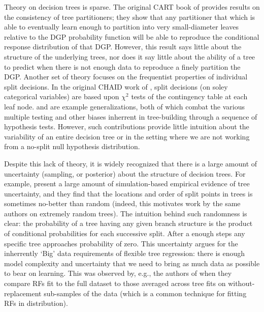 \documentclass{article}
\begin{document}
Theory on decision trees is sparse. The original CART book of
\cite{breiman_classification_1984} provides results on the consistency
of tree partitioners; they show that any partitioner that which is able
to eventually learn enough to partition into very small-diameter leaves
relative to the DGP probability function will be able to reproduce the
conditional response distribution of that DGP. However, this result says
little about the structure of the underlying trees, nor does it say
little about the ability of a tree to predict when there is not enough
data to reproduce a finely partition the DGP. Another set of theory
focuses on the frequentist properties of individual split decisions. In
the original CHAID work of \cite{kass_exploratory_1980}, split decisions
(on soley categorical variables) are based upon $\chi^2$ tests of the
contingency table at each leaf node. \cite{loh_regression_2002} and
\cite{hothorn_unbiased_2006} are example generalizations, both of which
combat the various multiple testing and other biases inherrent in
tree-building through a sequence of hypothesis tests. However, such
contributions provide little intuition about the variability of an
entire decision tree or in the setting where we are not working from a
no-split null hypothesis distribution.

Despite this lack of theory, it is widely recognized that there is a
large amount of uncertainty (sampling, or posterior) about the structure
of decision trees. For example, \cite{geurts_investigation_2000} present
a large amount of simulation-based empirical evidence of tree
uncertainty, and they find that the locations and order of split points
in trees is sometimes no-better than random (indeed, this motivates work
by the same authors on extremely random trees). The intuition behind
such randomness is clear: the probability of a tree having any given
branch structure is the product of conditional probabilities for each
successive split. After a enough steps any specific tree approaches
probability of zero. This uncertainty argues for the inherrently `Big'
data requirements of flexible tree regression: there is enough model
complexity and uncertainty that we need to bring as much data as
possible to bear on learning. This was observed by, e.g., the authors of
\cite{panda_planet:_2009} when they compare RFs fit to the full dataset
to those averaged across tree fits on without-replacement sub-samples of
the data (which is a common technique for fitting RFs in distribution).
\end{document}
